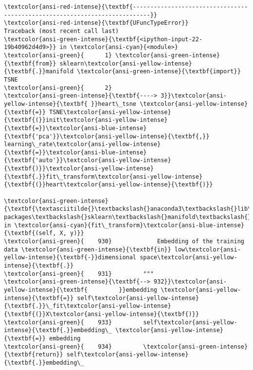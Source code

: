 \documentclass[11pt]{article}
\begin{document}
    \begin{Verbatim}[commandchars=\\\{\}, frame=single, framerule=2mm, rulecolor=\color{outerrorbackground}]
\textcolor{ansi-red-intense}{\textbf{---------------------------------------------------------------------------}}
\textcolor{ansi-red-intense}{\textbf{UFuncTypeError}}                            Traceback (most recent call last)
\textcolor{ansi-green-intense}{\textbf{<ipython-input-22-19b40962d4d9>}} in \textcolor{ansi-cyan}{<module>}
\textcolor{ansi-green}{      1} \textcolor{ansi-green-intense}{\textbf{from}} sklearn\textcolor{ansi-yellow-intense}{\textbf{.}}manifold \textcolor{ansi-green-intense}{\textbf{import}} TSNE
\textcolor{ansi-green}{      2} 
\textcolor{ansi-green-intense}{\textbf{----> 3}}\textcolor{ansi-yellow-intense}{\textbf{ }}heart\_tsne \textcolor{ansi-yellow-intense}{\textbf{=}} TSNE\textcolor{ansi-yellow-intense}{\textbf{(}}init\textcolor{ansi-yellow-intense}{\textbf{=}}\textcolor{ansi-blue-intense}{\textbf{'pca'}}\textcolor{ansi-yellow-intense}{\textbf{,}} learning\_rate\textcolor{ansi-yellow-intense}{\textbf{=}}\textcolor{ansi-blue-intense}{\textbf{'auto'}}\textcolor{ansi-yellow-intense}{\textbf{)}}\textcolor{ansi-yellow-intense}{\textbf{.}}fit\_transform\textcolor{ansi-yellow-intense}{\textbf{(}}heart\textcolor{ansi-yellow-intense}{\textbf{)}}

\textcolor{ansi-green-intense}{\textbf{\textasciitilde{}\textbackslash{}anaconda3\textbackslash{}lib\textbackslash{}site-packages\textbackslash{}sklearn\textbackslash{}manifold\textbackslash{}\_t\_sne.py}} in \textcolor{ansi-cyan}{fit\_transform}\textcolor{ansi-blue-intense}{\textbf{(self, X, y)}}
\textcolor{ansi-green}{    930}             Embedding of the training data \textcolor{ansi-green-intense}{\textbf{in}} low\textcolor{ansi-yellow-intense}{\textbf{-}}dimensional space\textcolor{ansi-yellow-intense}{\textbf{.}}
\textcolor{ansi-green}{    931}         """
\textcolor{ansi-green-intense}{\textbf{--> 932}}\textcolor{ansi-yellow-intense}{\textbf{         }}embedding \textcolor{ansi-yellow-intense}{\textbf{=}} self\textcolor{ansi-yellow-intense}{\textbf{.}}\_fit\textcolor{ansi-yellow-intense}{\textbf{(}}X\textcolor{ansi-yellow-intense}{\textbf{)}}
\textcolor{ansi-green}{    933}         self\textcolor{ansi-yellow-intense}{\textbf{.}}embedding\_ \textcolor{ansi-yellow-intense}{\textbf{=}} embedding
\textcolor{ansi-green}{    934}         \textcolor{ansi-green-intense}{\textbf{return}} self\textcolor{ansi-yellow-intense}{\textbf{.}}embedding\_


\end{Verbatim}
\end{document}
